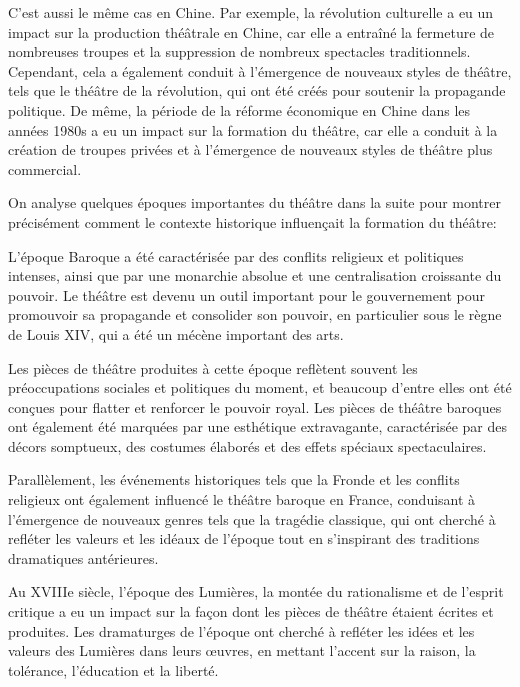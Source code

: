 \documentclass[UTF8,a4paper,12pt]{ctexart}
\numberwithin{equation}{section}
\newcommand{\mycite}[1]{\cite{#1}}
\begin{document}
C'est aussi le même cas en Chine. Par exemple, la révolution culturelle a eu un impact sur la production théâtrale en Chine, car elle a entraîné la fermeture de nombreuses troupes et la suppression de nombreux spectacles traditionnels. Cependant, cela a également conduit à l'émergence de nouveaux styles de théâtre, tels que le théâtre de la révolution, qui ont été créés pour soutenir la propagande politique. De même, la période de la réforme économique en Chine dans les années 1980s a eu un impact sur la formation du théâtre, car elle a conduit à la création de troupes privées et à l'émergence de nouveaux styles de théâtre plus commercial.

On analyse quelques époques importantes du théâtre dans la suite pour montrer précisément comment le contexte historique influençait la formation du théâtre: 


L'époque Baroque a été caractérisée par des conflits religieux et politiques intenses, ainsi que par une monarchie absolue et une centralisation croissante du pouvoir. Le théâtre est devenu un outil important pour le gouvernement pour promouvoir sa propagande et consolider son pouvoir, en particulier sous le règne de Louis XIV, qui a été un mécène important des arts.

Les pièces de théâtre produites à cette époque reflètent souvent les préoccupations sociales et politiques du moment, et beaucoup d'entre elles ont été conçues pour flatter et renforcer le pouvoir royal\mycite{despois1874theatre}. Les pièces de théâtre baroques ont également été marquées par une esthétique extravagante, caractérisée par des décors somptueux, des costumes élaborés et des effets spéciaux spectaculaires.

Parallèlement, les événements historiques tels que la Fronde et les conflits religieux ont également influencé le théâtre baroque en France, conduisant à l'émergence de nouveaux genres tels que la tragédie classique, qui ont cherché à refléter les valeurs et les idéaux de l'époque tout en s'inspirant des traditions dramatiques antérieures. 


Au XVIIIe siècle, l'époque des Lumières, la montée du rationalisme et de l'esprit critique a eu un impact sur la façon dont les pièces de théâtre étaient écrites et produites. Les dramaturges de l'époque ont cherché à refléter les idées et les valeurs des Lumières dans leurs œuvres, en mettant l'accent sur la raison, la tolérance, l'éducation et la liberté.
\end{document}
